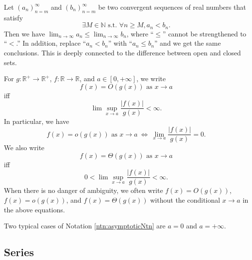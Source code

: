 \begin{rem}
  Let $(a_n)_{n=m}^{\infty}$ and $(b_n)_{n=m}^{\infty}$
  be two convergent sequences of real numbers
  that satisfy
  \begin{displaymath}
    \exists M\in \mathbb{N} \text{ s.t. }
    \forall n\ge M, a_n< b_n.
  \end{displaymath}
  Then we have
  $\lim_{n\rightarrow \infty} a_n\le \lim_{n\rightarrow  \infty} b_n$, 
  where ``$\le$'' cannot be strengthened to ``$<$.''
  In addition, replace ``$a_n< b_n$''
  with ``$a_n\le b_n$'' and we get the same conclusions.
  This is deeply connected to the difference between
  open and closed sets.
\end{rem}

\begin{ntn}
  \label{ntn:asymptoticNtn}
  For $g:\mathbb{R}^+\rightarrow\mathbb{R}^+$, 
  $f:\mathbb{R} \rightarrow\mathbb{R}$, 
  and $a\in [0,+\infty]$, 
  we write
  \begin{displaymath}
    f(x) = O(g(x)) \text{ as } x\to a %
  \end{displaymath}
  iff %
  \begin{displaymath}
    \lim\sup_{x\rightarrow a} \frac{|f(x)|}{g(x)} < \infty.
  \end{displaymath}
  In particular, we have
  \begin{displaymath}
    f(x) = o(g(x)) \text{ as } x\to a
    \ \Leftrightarrow\
    \lim_{x\rightarrow a} \frac{|f(x)|}{g(x)} = 0.
  \end{displaymath}
  We also write
  \begin{displaymath}
    f(x)=\Theta(g(x)) \text{ as } x\to a %
  \end{displaymath}
  iff
  \begin{displaymath}
    0< \lim\sup_{x\rightarrow a} \frac{|f(x)|}{g(x)} < \infty.
  \end{displaymath}
  When there is no danger of ambiguity,
  we often write $f(x)=O(g(x))$,
  $f(x)=o(g(x))$, and $f(x)=\Theta(g(x))$
  without the conditional $x \rightarrow a$
  in the above equations.
\end{ntn}

\begin{rem}
  Two typical cases of Notation \ref{ntn:asymptoticNtn}
  are $a=0$ and $a=+\infty$.
\end{rem}

\subsection{Series}
\label{sec:series}

